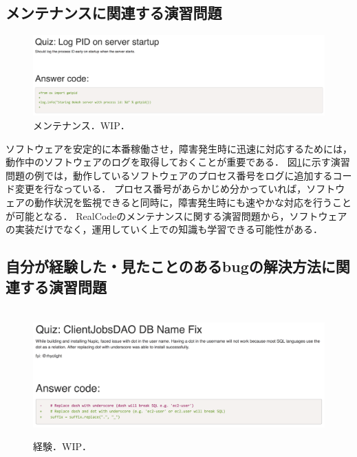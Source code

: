 \subsection{メンテナンスに関連する演習問題}

\begin{figure}[t]
	\centering
  \includegraphics[width=1.0\columnwidth]{20190107-lab-study-maintenance-exercise.png}
  \caption{メンテナンス．WIP．}
  \label{fig:lab-study-eg-maintenance}
\end{figure}

ソフトウェアを安定的に本番稼働させ，障害発生時に迅速に対応するためには，動作中のソフトウェアのログを取得しておくことが重要である．
図\ref{fig:lab-study-eg-maintenance}に示す演習問題の例では，動作しているソフトウェアのプロセス番号をログに追加するコード変更を行なっている．
プロセス番号があらかじめ分かっていれば，ソフトウェアの動作状況を監視できると同時に，障害発生時にも速やかな対応を行うことが可能となる．
RealCodeのメンテナンスに関する演習問題から，ソフトウェアの実装だけでなく，運用していく上での知識も学習できる可能性がある．

\subsection{自分が経験した・見たことのあるbugの解決方法に関連する演習問題}

\begin{figure}[t]
　\centering
　\includegraphics[width=1.0\columnwidth]{20190107-lab-study-experience-exercise.png}
  \caption{経験．WIP．}
  \label{fig:lab-study-eg-experience}
\end{figure}

